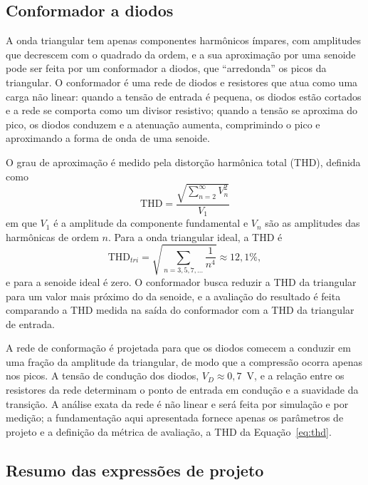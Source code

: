 \documentclass[11pt,a4paper]{article}
\begin{document}
\subsection{Conformador a diodos}
\label{sec:teo_conformador}
 
A onda triangular tem apenas componentes harmônicos ímpares, com amplitudes que
decrescem com o quadrado da ordem, e a sua aproximação por uma senoide pode ser
feita por um conformador a diodos, que ``arredonda'' os picos da triangular. O
conformador é uma rede de diodos e resistores que atua como uma carga não
linear: quando a tensão de entrada é pequena, os diodos estão cortados e a rede
se comporta como um divisor resistivo; quando a tensão se aproxima do pico, os
diodos conduzem e a atenuação aumenta, comprimindo o pico e aproximando a forma
de onda de uma senoide.
 
O grau de aproximação é medido pela distorção harmônica total (THD), definida
como
\begin{equation}
\text{THD} = \frac{\sqrt{\sum_{n=2}^{\infty} V_n^2}}{V_1}
\label{eq:thd}
\end{equation}
em que $V_1$ é a amplitude da componente fundamental e $V_n$ são as amplitudes
das harmônicas de ordem $n$. Para a onda triangular ideal, a THD é
\begin{equation}
\text{THD}_{tri} = \sqrt{\sum_{n=3,5,7,\dots}\frac{1}{n^4}}
\approx 12{,}1\%,
\label{eq:thd_tri}
\end{equation}
e para a senoide ideal é zero. O conformador busca reduzir a THD da triangular
para um valor mais próximo do da senoide, e a avaliação do resultado é feita
comparando a THD medida na saída do conformador com a THD da triangular de
entrada.
 
A rede de conformação é projetada para que os diodos comecem a conduzir em uma
fração da amplitude da triangular, de modo que a compressão ocorra apenas nos
picos. A tensão de condução dos diodos, $V_D \approx 0{,}7$~V, e a relação entre
os resistores da rede determinam o ponto de entrada em condução e a suavidade da
transição. A análise exata da rede é não linear e será feita por simulação e por
medição; a fundamentação aqui apresentada fornece apenas os parâmetros de
projeto e a definição da métrica de avaliação, a THD da
Equação~\eqref{eq:thd}.
 
\subsection{Resumo das expressões de projeto}
\label{sec:teo_resumo}
 
\end{document}
